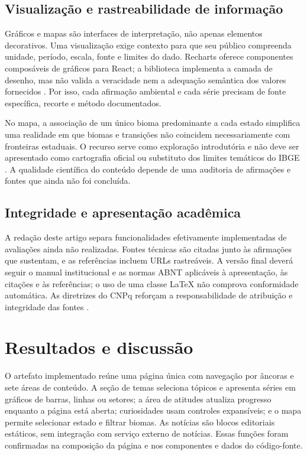 \documentclass[12pt,oneside,a4paper,brazil]{abntex2}
\begin{document}
\section{Visualização e rastreabilidade de informação}
Gráficos e mapas são interfaces de interpretação, não apenas elementos decorativos. Uma visualização exige contexto para que seu público compreenda unidade, período, escala, fonte e limites do dado. Recharts oferece componentes composáveis de gráficos para React; a biblioteca implementa a camada de desenho, mas não valida a veracidade nem a adequação semântica dos valores fornecidos \cite{recharts}. Por isso, cada afirmação ambiental e cada série precisam de fonte específica, recorte e método documentados.

No mapa, a associação de um único bioma predominante a cada estado simplifica uma realidade em que biomas e transições não coincidem necessariamente com fronteiras estaduais. O recurso serve como exploração introdutória e não deve ser apresentado como cartografia oficial ou substituto dos limites temáticos do IBGE \cite{ibge}. A qualidade científica do conteúdo depende de uma auditoria de afirmações e fontes que ainda não foi concluída.

\section{Integridade e apresentação acadêmica}
A redação deste artigo separa funcionalidades efetivamente implementadas de avaliações ainda não realizadas. Fontes técnicas são citadas junto às afirmações que sustentam, e as referências incluem URLs rastreáveis. A versão final deverá seguir o manual institucional e as normas ABNT aplicáveis à apresentação, às citações e às referências; o uso de uma classe LaTeX não comprova conformidade automática. As diretrizes do CNPq reforçam a responsabilidade de atribuição e integridade das fontes \cite{cnpq}.


\chapter{Resultados e discussão}
O artefato implementado reúne uma página única com navegação por âncoras e sete áreas de conteúdo. A seção de temas seleciona tópicos e apresenta séries em gráficos de barras, linhas ou setores; a área de atitudes atualiza progresso enquanto a página está aberta; curiosidades usam controles expansíveis; e o mapa permite selecionar estado e filtrar biomas. As notícias são blocos editoriais estáticos, sem integração com serviço externo de notícias. Essas funções foram confirmadas na composição da página e nos componentes e dados do código-fonte.
\end{document}

